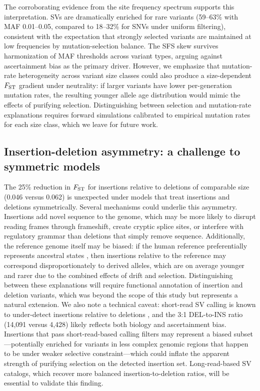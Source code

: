 The corroborating evidence from the site frequency spectrum supports this interpretation. SVs are dramatically enriched for rare variants (59--63\% with MAF 0.01--0.05, compared to 18--32\% for SNVs under uniform filtering), consistent with the expectation that strongly selected variants are maintained at low frequencies by mutation-selection balance. The SFS skew survives harmonization of MAF thresholds across variant types, arguing against ascertainment bias as the primary driver. However, we emphasize that mutation-rate heterogeneity across variant size classes could also produce a size-dependent $F_\mathrm{ST}$ gradient under neutrality: if larger variants have lower per-generation mutation rates, the resulting younger allele age distribution would mimic the effects of purifying selection. Distinguishing between selection and mutation-rate explanations requires forward simulations calibrated to empirical mutation rates for each size class, which we leave for future work.

\subsection*{Insertion-deletion asymmetry: a challenge to symmetric models}

The 25\% reduction in $F_\mathrm{ST}$ for insertions relative to deletions of comparable size (0.046 versus 0.062) is unexpected under models that treat insertions and deletions symmetrically. Several mechanisms could underlie this asymmetry. Insertions add novel sequence to the genome, which may be more likely to disrupt reading frames through frameshift, create cryptic splice sites, or interfere with regulatory grammar than deletions that simply remove sequence. Additionally, the reference genome itself may be biased: if the human reference preferentially represents ancestral states \citep{schneider2017}, then insertions relative to the reference may correspond disproportionately to derived alleles, which are on average younger and rarer due to the combined effects of drift and selection. Distinguishing between these explanations will require functional annotation of insertion and deletion variants, which was beyond the scope of this study but represents a natural extension. We also note a technical caveat: short-read SV calling is known to under-detect insertions relative to deletions \citep{ho2020}, and the 3:1 DEL-to-INS ratio (14,091 versus 4,428) likely reflects both biology and ascertainment bias. Insertions that pass short-read-based calling filters may represent a biased subset---potentially enriched for variants in less complex genomic regions that happen to be under weaker selective constraint---which could inflate the apparent strength of purifying selection on the detected insertion set. Long-read-based SV catalogs, which recover more balanced insertion-to-deletion ratios, will be essential to validate this finding.

